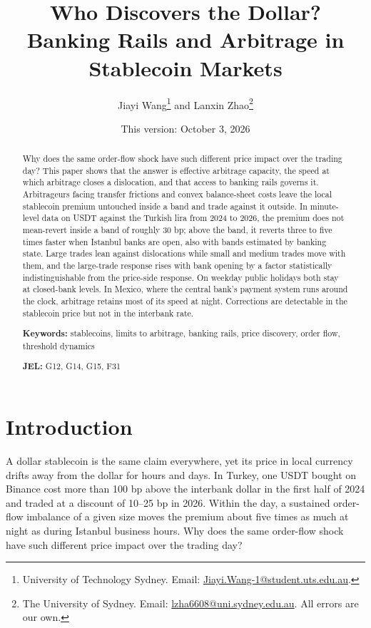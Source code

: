 \documentclass[12pt]{article}
\title{\textbf{Who Discovers the Dollar?}\\[4pt]
\large Banking Rails and Arbitrage in Stablecoin Markets}
\author{Jiayi Wang\thanks{University of Technology Sydney. Email: \href{mailto:Jiayi.Wang-1@student.uts.edu.au}{Jiayi.Wang-1@student.uts.edu.au}.} and Lanxin Zhao\thanks{The University of Sydney. Email: \href{mailto:lzha6608@uni.sydney.edu.au}{lzha6608@uni.sydney.edu.au}. All errors are our own.}}
\date{This version: October 3, 2026}
\theoremstyle{definition}
\theoremstyle{remark}
\begin{document}
\maketitle

\begin{abstract}
\noindent
Why does the same order-flow shock have such different price impact over the trading day? This paper shows that the answer is effective arbitrage capacity, the speed at which arbitrage closes a dislocation, and that access to banking rails governs it. Arbitrageurs facing transfer frictions and convex balance-sheet costs leave the local stablecoin premium untouched inside a band and trade against it outside. In minute-level data on USDT against the Turkish lira from 2024 to 2026, the premium does not mean-revert inside a band of roughly 30 bp; above the band, it reverts three to five times faster when Istanbul banks are open, also with bands estimated by banking state. Large trades lean against dislocations while small and medium trades move with them, and the large-trade response rises with bank opening by a factor statistically indistinguishable from the price-side response. On weekday public holidays both stay at closed-bank levels. In Mexico, where the central bank's payment system runs around the clock, arbitrage retains most of its speed at night. Corrections are detectable in the stablecoin price but not in the interbank rate.

\bigskip
\noindent\textbf{Keywords:} stablecoins, limits to arbitrage, banking rails, price discovery, order flow, threshold dynamics

\noindent\textbf{JEL:} G12, G14, G15, F31
\end{abstract}

\thispagestyle{empty}
\newpage
\setcounter{page}{1}

\section{Introduction}

A dollar stablecoin is the same claim everywhere, yet its price in local currency drifts away from the dollar for hours and days. In Turkey, one USDT bought on Binance cost more than 100 bp above the interbank dollar in the first half of 2024 and traded at a discount of 10--25 bp in 2026. Within the day, a sustained order-flow imbalance of a given size moves the premium about five times as much at night as during Istanbul business hours. Why does the same order-flow shock have such different price impact over the trading day?
\end{document}
